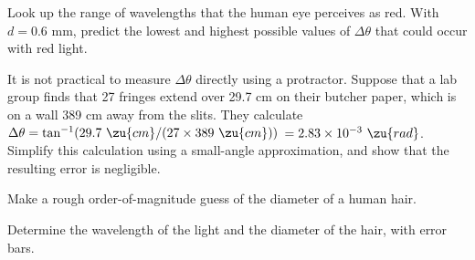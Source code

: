 \prelabquestion  Look up the range of wavelengths that the human eye perceives as red.
With $d=0.6$ mm, predict the lowest and highest possible values of $\Delta\theta$
that could occur with red light.

\prelabquestion  It is not practical to measure $\Delta\theta$ directly using a
protractor. Suppose that a lab group finds that 27 fringes extend over 29.7 cm
on their butcher paper, which is on a wall 389 cm away from the slits. They
calculate $\Delta\theta=\tan^{-1}(29.7\ \zu{cm}/(27\times389\ \zu{cm}))$
$=2.83\times10^{-3}\ \zu{rad}$.
Simplify this calculation using a small-angle approximation, and show that the resulting
error is negligible.

\prelabquestion  Make a rough order-of-magnitude guess of the diameter of a human hair.

\analysis

Determine the wavelength of the light and the diameter of
the hair, with error bars.
